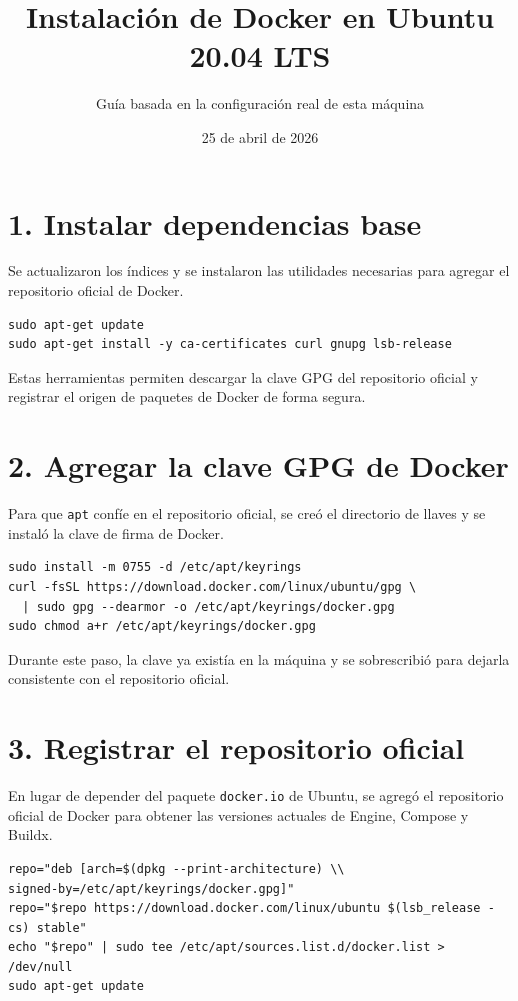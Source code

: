 \documentclass[12pt]{article}
\title{Instalaci\'on de Docker en Ubuntu 20.04 LTS}
\author{Gu\'ia basada en la configuraci\'on real de esta m\'aquina}
\date{25 de abril de 2026}
\begin{document}
\maketitle

\section*{1. Instalar dependencias base}
Se actualizaron los índices y se instalaron las utilidades necesarias para agregar el repositorio oficial de Docker.

\begin{verbatim}
sudo apt-get update
sudo apt-get install -y ca-certificates curl gnupg lsb-release
\end{verbatim}

Estas herramientas permiten descargar la clave GPG del repositorio oficial y registrar el origen de paquetes de Docker de forma segura.

\section*{2. Agregar la clave GPG de Docker}
Para que \texttt{apt} confíe en el repositorio oficial, se creó el directorio de llaves y se instaló la clave de firma de Docker.

\begin{verbatim}
sudo install -m 0755 -d /etc/apt/keyrings
curl -fsSL https://download.docker.com/linux/ubuntu/gpg \
  | sudo gpg --dearmor -o /etc/apt/keyrings/docker.gpg
sudo chmod a+r /etc/apt/keyrings/docker.gpg
\end{verbatim}

Durante este paso, la clave ya existía en la máquina y se sobrescribió para dejarla consistente con el repositorio oficial.

\section*{3. Registrar el repositorio oficial}
En lugar de depender del paquete \texttt{docker.io} de Ubuntu, se agregó el repositorio oficial de Docker para obtener las versiones actuales de Engine, Compose y Buildx.

{\small
\begin{verbatim}
repo="deb [arch=$(dpkg --print-architecture) \\
signed-by=/etc/apt/keyrings/docker.gpg]"
repo="$repo https://download.docker.com/linux/ubuntu $(lsb_release -cs) stable"
echo "$repo" | sudo tee /etc/apt/sources.list.d/docker.list > /dev/null
sudo apt-get update
\end{verbatim}
}
\end{document}
